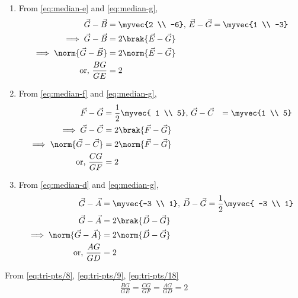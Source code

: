\solution 
\begin{enumerate}
\item From 
	\eqref{eq:median-e}
	and
	\eqref{eq:median-g},
\begin{align}
		\label{eq:tri-pts/4} \vec{G}-\vec{B} &= \myvec{2 \\ -6},\, 
 \vec{E}-\vec{G} = \myvec{1 \\ -3} \\
	\implies \vec{G}-\vec{B} &= 2 \brak{ \vec{E}-\vec{G} }
	\\
	\implies \norm{\vec{G}-\vec{B}} &= 2 \norm{ \vec{E}-\vec{G} }
	\\
	\text{or, }		\label{eq:tri-pts/8}\frac{BG}{GE} &=  2  
\end{align}		
\item From 
	\eqref{eq:median-f}
	and
	\eqref{eq:median-g},
\begin{align}
		 \vec{F}-\vec{G} &= \frac{1}{2}\myvec{ 1 \\ 5},\, 
 \vec{G}-\vec{C} &= \myvec{1 \\ 5} \\
	\implies 		 \vec{G}-\vec{C} &= 2 \brak{\vec{F}-\vec{G}} 
	\\
	\implies 		 \norm{\vec{G}-\vec{C}} &= 2 \norm{\vec{F}-\vec{G}} 
	\\
		\text{or, }	\frac{CG}{GF} &=  2		
\label{eq:tri-pts/9}
\end{align}
\item From
	\eqref{eq:median-d}
	and
	\eqref{eq:median-g},
\begin{align}
		\label{eq:tri-pts/14} \vec{G}-\vec{A} &= \myvec{-3 \\ 1} ,\,
 \vec{D}-\vec{G} = \frac{1}{2}\myvec{ -3 \\ 1}
 \\
	\vec{G}-\vec{A} &= 
	2\brak{ \vec{D}-\vec{G} } 
	\\
\implies		 \norm{\vec{G}-\vec{A}} &= 
 2\norm{\vec{D}-\vec{G}} 
 \\
		\text{or, }		\label{eq:tri-pts/18}\frac{AG}{GD} &=   2		
\end{align}
\end{enumerate}
From \eqref{eq:tri-pts/8}, \eqref{eq:tri-pts/9}, \eqref{eq:tri-pts/18}
\begin{align}
		\frac{BG}{GE} = 
		\frac{CG}{GF} =
		\frac{AG}{GD} = 2
\end{align}
